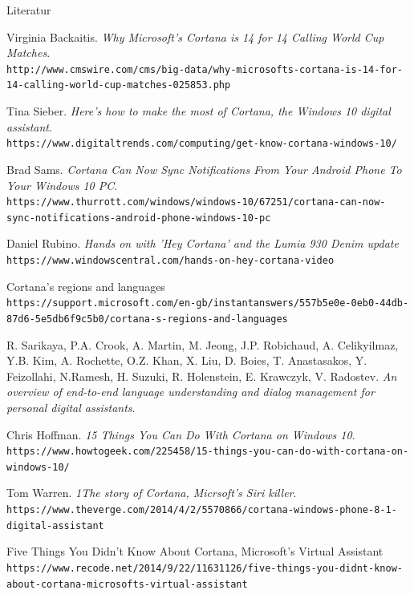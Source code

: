 \documentclass[18pt]{beamer}
\begin{document}
\begin{frame}[allowframebreaks]{Literatur}
\begin{thebibliography}{9}
	Virginia Backaitis.
	\textit{Why Microsoft's Cortana is 14 for 14 Calling World Cup Matches}.
	\\\texttt{http://www.cmswire.com/cms/big-data/why-microsofts-cortana-is-14-for-14-calling-world-cup-matches-025853.php}
	
	Tina Sieber.
	\textit{Here’s how to make the most of Cortana, the Windows 10 digital assistant}.
	\\\texttt{https://www.digitaltrends.com/computing/get-know-cortana-windows-10/}
	
	Brad Sams.
	\textit{Cortana Can Now Sync Notifications From Your Android Phone To Your Windows 10 PC}.
	\\\texttt{https://www.thurrott.com/windows/windows-10/67251/cortana-can-now-sync-notifications-android-phone-windows-10-pc}
	
	Daniel Rubino.
	\textit{Hands on with 'Hey Cortana' and the Lumia 930 Denim update}
	\\\texttt{https://www.windowscentral.com/hands-on-hey-cortana-video}
	
	Cortana's regions and languages
	\\\texttt{https://support.microsoft.com/en-gb/instantanswers/557b5e0e-0eb0-44db-87d6-5e5db6f9c5b0/cortana-s-regions-and-languages}
	
	R. Sarikaya, P.A. Crook, A. Martin, M. Jeong, J.P. Robichaud, A. Celikyilmaz, Y.B. Kim, A. Rochette, O.Z. Khan, X. Liu, D. Boies, T. Anastasakos, Y. Feizollahi, N.Ramesh, H. Suzuki, R. Holenstein, E. Krawczyk, V. Radostev. 
	\textit{An overview of end-to-end language understanding and dialog management for personal digital assistants}.
	
	Chris Hoffman.
	\textit{15 Things You Can Do With Cortana on Windows 10}.
	\\\texttt{https://www.howtogeek.com/225458/15-things-you-can-do-with-cortana-on-windows-10/}
	
	Tom Warren.
	\textit{1The story of Cortana, Micrsoft's Siri killer}.
	\\\texttt{https://www.theverge.com/2014/4/2/5570866/cortana-windows-phone-8-1-digital-assistant}
	
	Five Things You Didn't Know About Cortana, Microsoft’s Virtual Assistant
	\\\texttt{https://www.recode.net/2014/9/22/11631126/five-things-you-didnt-know-about-cortana-microsofts-virtual-assistant}
	

\end{thebibliography}
\end{frame}
\end{document}
